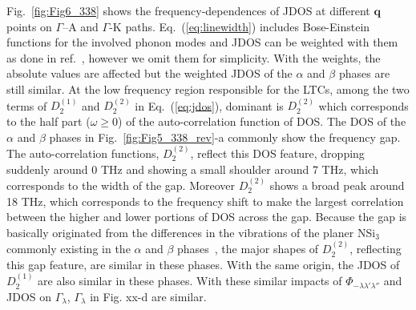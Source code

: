 \documentclass[twocolumn,amsmath,amssymb,a4paper,prb,superscriptaddress,floatfix]{revtex4-1}
\begin{document}
Fig.~\ref{fig:Fig6_338} shows the frequency-dependences of JDOS at different $\mathbf{q}$ points on $\Gamma$--A and $\Gamma$-K paths.
Eq.~(\ref{eq:linewidth}) includes Bose-Einstein functions for the involved
phonon modes and JDOS can be weighted with them as done in ref.~, however we omit them for simplicity. With the weights, the absolute
values are affected but the weighted JDOS of the $\alpha$ and $\beta$ phases
are still similar. At the low frequency region responsible for the LTCs, among
the two terms of $D_2^{(1)}$ and $D_2^{(2)}$ in Eq.~(\ref{eq:jdos}), dominant
is $D_2^{(2)}$ which corresponds to the half part ($\omega \geq  0$) of the
auto-correlation function of DOS. The DOS of the $\alpha$ and $\beta$ phases in
Fig.~\ref{fig:Fig5_338_rev}-a commonly show the frequency gap.  The auto-correlation functions,
$D_2^{(2)}$, reflect this DOS feature, dropping suddenly around 0 THz and
showing a small shoulder around 7 THz, which corresponds to the width of the
gap. Moreover $D_2^{(2)}$ shows a broad peak around 18 THz, which corresponds
to the frequency shift to make the largest correlation between the higher and
lower portions of DOS across the gap. Because the gap is basically originated
from the differences in the vibrations of the planer NSi$_3$ commonly existing
in the $\alpha$ and $\beta$ phases~\cite{kuwabara}, the major shapes of
$D_2^{(2)}$, reflecting this gap feature, are similar in these phases. With the
same origin, the JDOS of $D_2^{(1)}$ are also similar in these phases. With
these similar impacts of $\Phi_{-\lambda\lambda'\lambda''}$ and JDOS on
$\Gamma_\lambda$, $\Gamma_\lambda$ in Fig. xx-d are similar.  
\end{document}
